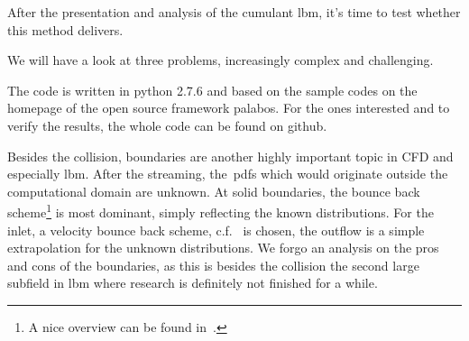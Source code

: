 After the presentation and analysis of the cumulant \gls{lbm}, it's time to test whether this method delivers.

We will have a look at three problems, increasingly complex and challenging.

The code is written in python 2.7.6 and based on the sample codes on the homepage of the open source framework palabos.
For the ones interested and to verify the results, the whole code can be found on github.

Besides the collision, boundaries are another highly important topic in CFD and especially \gls{lbm}.
After the streaming, the~\glspl{pdf} which would originate outside the computational domain are unknown.
At solid boundaries, the bounce back scheme\footnote{A nice overview can be found in~\cite{boundaries}.} is most dominant, simply reflecting the known distributions.
For the inlet, a velocity bounce back scheme, c.f.~\cite{yu2003viscous} is chosen, the outflow is a simple extrapolation for the unknown distributions.
We forgo an analysis on the pros and cons of the boundaries, as this is besides the collision the second large subfield in \gls{lbm} where research is definitely not finished for a while.
